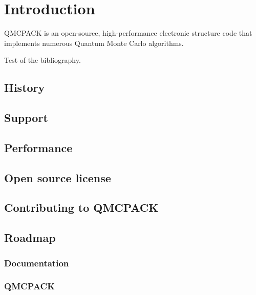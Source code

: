 \chapter{Introduction}

QMCPACK is an open-source, high-performance electronic structure code that implements numerous Quantum Monte Carlo algorithms.

Test of the bibliography\cite{CeperleyAlderPRL1980}.

\section{History}
\section{Support}
\section{Performance}
\section{Open source license}
\section{Contributing to QMCPACK}
\section{Roadmap}
\subsection{Documentation}
\subsection{QMCPACK}
